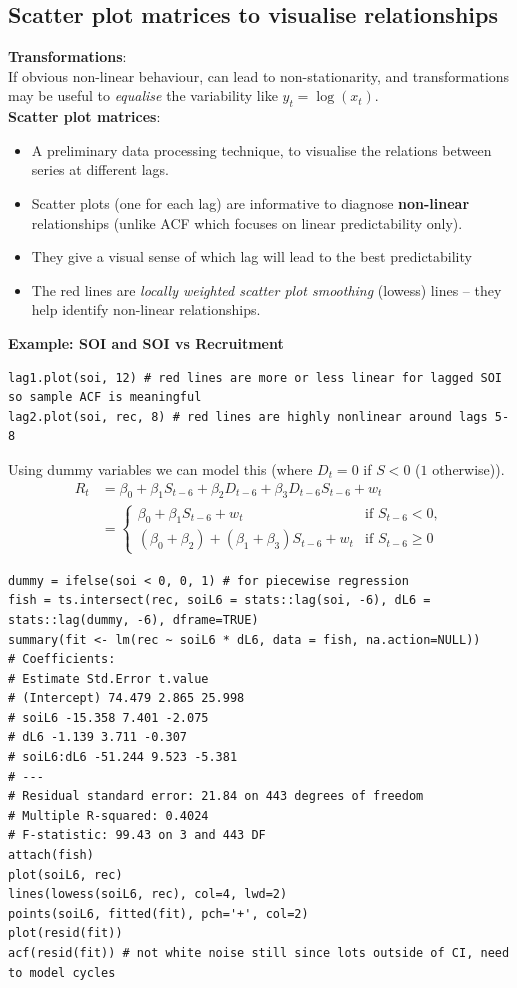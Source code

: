 \documentclass[11pt]{article}
\newcommand{\noi}{\noindent}
\begin{document}
\subsection{Scatter plot matrices to visualise relationships}
\noi \textbf{Transformations}: \\
\noi If obvious non-linear behaviour, can lead to non-stationarity, and transformations may be useful to \textit{equalise} the variability like $y_t = \log(x_t)$. \\

\noi \textbf{Scatter plot matrices}: \\
\begin{itemize}
    \item A preliminary data processing technique, to visualise the relations between series at different lags.
    \item Scatter plots (one for each lag) are informative to diagnose \textbf{non-linear} relationships (unlike ACF which focuses on linear predictability only).
    \item They give a visual sense of which lag will lead to the best predictability
    \item The red lines are \textit{locally weighted scatter plot smoothing} (lowess) lines -- they help identify non-linear relationships.
\end{itemize} \phantom{i}

\noi \textbf{Example: SOI and SOI vs Recruitment}
\begin{lstlisting}
lag1.plot(soi, 12) # red lines are more or less linear for lagged SOI so sample ACF is meaningful
lag2.plot(soi, rec, 8) # red lines are highly nonlinear around lags 5-8
\end{lstlisting}

\noi Using dummy variables we can model this (where $D_t = 0$ if $S < 0$ ($1$ otherwise)).
\begin{align*}
    R_t &= \beta_0 + \beta_1 S_{t-6} + \beta_2D_{t-6} + \beta_3D_{t-6}S_{t-6} + w_t \\
    &= \begin{cases}
        \beta_0 + \beta_1 S_{t-6} + w_t & \text{if  } S_{t-6} < 0, \\
        (\beta_0 + \beta_2) + (\beta_1 + \beta_3)S_{t-6} + w_t & \text{if  } S_{t-6} \geq 0
    \end{cases}
\end{align*}
\begin{lstlisting}
dummy = ifelse(soi < 0, 0, 1) # for piecewise regression
fish = ts.intersect(rec, soiL6 = stats::lag(soi, -6), dL6 = stats::lag(dummy, -6), dframe=TRUE)
summary(fit <- lm(rec ~ soiL6 * dL6, data = fish, na.action=NULL))
# Coefficients:
# Estimate Std.Error t.value
# (Intercept) 74.479 2.865 25.998
# soiL6 -15.358 7.401 -2.075
# dL6 -1.139 3.711 -0.307
# soiL6:dL6 -51.244 9.523 -5.381
# ---
# Residual standard error: 21.84 on 443 degrees of freedom
# Multiple R-squared: 0.4024
# F-statistic: 99.43 on 3 and 443 DF
attach(fish)
plot(soiL6, rec)
lines(lowess(soiL6, rec), col=4, lwd=2)
points(soiL6, fitted(fit), pch='+', col=2)
plot(resid(fit))
acf(resid(fit)) # not white noise still since lots outside of CI, need to model cycles
\end{lstlisting}
\end{document}

